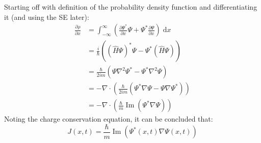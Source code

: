\begin{sol}
Starting off with definition of the probability density function and differentiating it (and using the SE later):
\begin{align*}
	\frac{\partial \rho}{\partial x} &= \int_{-\infty}^{\infty}(\frac{\partial \Psi^*}{\partial x}\Psi + \Psi^*\frac{\partial \Psi}{\partial x})\;\mathrm{d}x \\ &= \frac{i}{\hbar}((\hat{H}\Psi)^*\Psi - \Psi^*(\hat{H}\Psi)) \\ &= \frac{\hbar}{2im}(\Psi\nabla^2\Psi^* - \Psi^*\nabla^2\Psi) \\ &= -\nabla \cdot (\frac{\hbar}{2im}(\Psi^*\nabla\Psi - \Psi\nabla\Psi^*)) \\ &= -\nabla \cdot (\frac{\hbar}{m}\operatorname{Im}(\Psi^*\nabla\Psi))
\end{align*}
Noting the charge conservation equation, it can be concluded that: $$J(x, t) = \frac{\hbar}{m}\operatorname{Im}(\Psi^*(x, t)\nabla\Psi(x, t))$$
\end{sol}